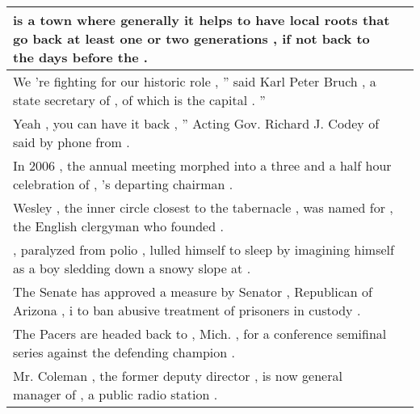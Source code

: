 \begin{table}
\begin{tabular}{p{} P{1,3cm} }
\hline
{} {\underline{} is a town where generally it helps to have local roots that go back at least one or two generations , if not back to the days before the \underline{} .} &    \\ 
\hline
{} {We 're fighting for our historic role , '' said Karl Peter Bruch , a state secretary of \underline{} , of which \underline{} is the capital . ''} &    \\ 
\hline
{} {Yeah , you can have it back , '' Acting Gov. Richard J. Codey of \underline{} said by phone from \underline{} .} &    \\ 
\hline
{} {In 2006 , the annual meeting morphed into a three and a half hour celebration of \underline{} , \underline{} 's departing chairman .} &    \\ 
\hline
{} {Wesley , the inner circle closest to the tabernacle , was named for \underline{} , the English clergyman who founded \underline{} .} &    \\ 
\hline
{} {\underline{} , paralyzed from polio , lulled himself to sleep by imagining himself as a boy sledding down a snowy slope at \underline{} .} &    \\ 
\hline
{} {The Senate has approved a measure by Senator \underline{} , Republican of Arizona , i to ban abusive treatment of prisoners in \underline{} custody .} &    \\ 
\hline
{} {The Pacers are headed back to \underline{} , Mich. , for a conference semifinal series against the defending champion \underline{} .} &    \\ 
\hline
{} {Mr. Coleman , the former deputy director , is now general manager of \underline{} , a \underline{} public radio station .} &    \\ 

\end{tabular}
\end{table}
